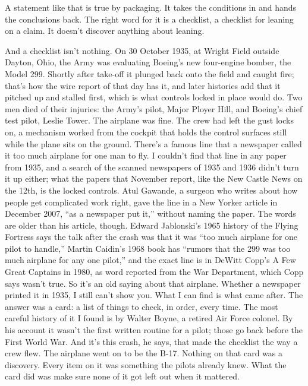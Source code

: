 \documentclass[11pt,twoside]{article}
\theoremstyle{thielethm}
\theoremstyle{thieledef}
\theoremstyle{thieledef}
\theoremstyle{thieledef}
\theoremstyle{thielethm}
\theoremstyle{thieleobs}
\theoremstyle{thielethm}
\begin{document}
A statement like that is true by packaging. It takes the conditions in and hands the conclusions back. The right word for it is a checklist, a checklist for leaning on a claim. It doesn't discover anything about leaning.

And a checklist isn't nothing. On 30 October 1935, at Wright Field outside Dayton, Ohio, the Army was evaluating Boeing's new four-engine bomber, the Model 299. Shortly after take-off it plunged back onto the field and caught fire; that's how the wire report of that day has it, and later histories add that it pitched up and stalled first, which is what controls locked in place would do. Two men died of their injuries: the Army's pilot, Major Ployer Hill, and Boeing's chief test pilot, Leslie Tower. The airplane was fine. The crew had left the gust locks on, a mechanism worked from the cockpit that holds the control surfaces still while the plane sits on the ground. There's a famous line that a newspaper called it too much airplane for one man to fly. I couldn't find that line in any paper from 1935, and a search of the scanned newspapers of 1935 and 1936 didn't turn it up either; what the papers that November report, like the New Castle News on the 12th, is the locked controls. Atul Gawande, a surgeon who writes about how people get complicated work right, gave the line in a New Yorker article in December 2007, ``as a newspaper put it,'' without naming the paper. The words are older than his article, though. Edward Jablonski's 1965 history of the Flying Fortress says the talk after the crash was that it was ``too much airplane for one pilot to handle,'' Martin Caidin's 1968 book has ``rumors that the 299 was too much airplane for any one pilot,'' and the exact line is in DeWitt Copp's A Few Great Captains in 1980, as word reported from the War Department, which Copp says wasn't true. So it's an old saying about that airplane. Whether a newspaper printed it in 1935, I still can't show you. What I can find is what came after. The answer was a card: a list of things to check, in order, every time. The most careful history of it I found is by Walter Boyne, a retired Air Force colonel. By his account it wasn't the first written routine for a pilot; those go back before the First World War. And it's this crash, he says, that made the checklist the way a crew flew. The airplane went on to be the B-17. Nothing on that card was a discovery. Every item on it was something the pilots already knew. What the card did was make sure none of it got left out when it mattered.
\end{document}
